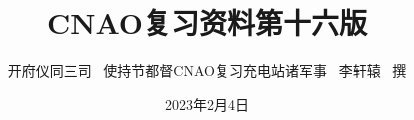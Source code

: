 \documentclass[a4paper,12pt,titlepage,oneside]{ctexbook}
\begin{document}
\author{开府仪同三司 \ 使持节都督CNAO复习充电站诸军事 \ 李轩辕 \ 撰}
\title{CNAO复习资料第十六版}
\date{2023年2月4日}
\frontmatter
\maketitle
\tableofcontents

\mainmatter






\backmatter
\end{document}
